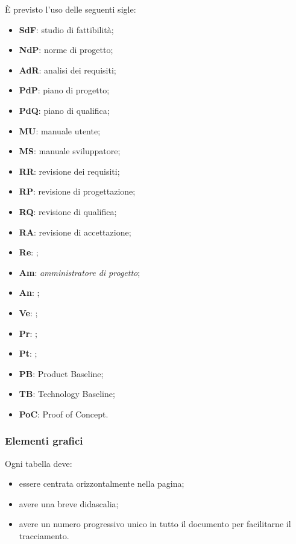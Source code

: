             È previsto l'uso delle seguenti sigle:
                \begin{itemize}
                \item \textbf{SdF}: studio di fattibilità;
                \item \textbf{NdP}: norme di progetto;
                \item \textbf{AdR}: analisi dei requisiti;
                \item \textbf{PdP}: piano di progetto;
                \item \textbf{PdQ}: piano di qualifica;
                \item \textbf{MU}: manuale utente;
                \item \textbf{MS}: manuale sviluppatore;
                \item \textbf{RR}: revisione dei requisiti;
                \item \textbf{RP}: revisione di progettazione;
                \item \textbf{RQ}: revisione di qualifica;
                \item \textbf{RA}: revisione di accettazione;
                \item \textbf{Re}: \roleProjectManagerP{};
                \item \textbf{Am}: \textit{amministratore di progetto};
                \item \textbf{An}: \roleAnalyst{};
                \item \textbf{Ve}: \roleVerifier{};
                \item \textbf{Pr}: \roleProgrammer{};
                \item \textbf{Pt}: \roleDesigner{};
                \item \textbf{PB}: Product Baseline;
                \item \textbf{TB}: Technology Baseline;
                \item \textbf{PoC}: Proof of Concept.
                \end{itemize}

        \subsubsection{Elementi grafici}
                Ogni tabella deve:
                \begin{itemize}
                    \item essere centrata orizzontalmente nella pagina;
                    \item avere una breve didascalia;
                    \item avere un numero progressivo unico in tutto il documento per facilitarne il tracciamento.
                \end{itemize}
            
